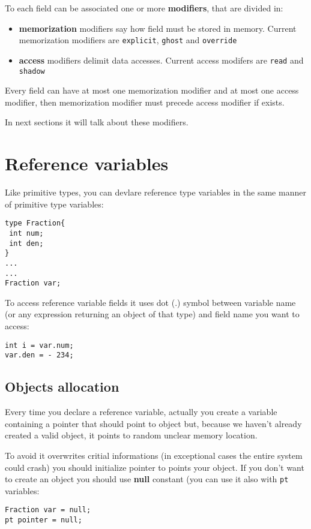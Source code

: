 \documentclass[10pt]{book}%
\newcommand{\code}[1]{\texttt{#1}}
\renewcommand{\emph}[1]{\textbf{#1}}
\newenvironment{codeenv}{
\begin{mdframed}[backgroundcolor=black!20,topline=false,leftline=false,rightline=false,bottomline=false]
}
{\end{mdframed}}
\begin{document}
To each field can be associated one or more \emph{modifiers}, that are divided in:
\begin{itemize}
\item \emph{memorization} modifiers say how field must be stored in memory. Current memorization modifiers are \code{explicit}, \code{ghost} and \code{override}
\item \emph{access} modifiers delimit data accesses. Current access modifers are \code{read} and \code{shadow}
\end{itemize}
Every field can have at most one memorization modifier and at most one access modifier, then memorization modifier must precede access modifier if exists.

In next sections it will talk about these modifiers.

\section{Reference variables}
Like primitive types, you can devlare reference type variables in the same manner of primitive type variables:
\begin{codeenv}
\begin{verbatim}
type Fraction{
 int num;
 int den;
}
...
...
Fraction var;
\end{verbatim}
\end{codeenv}
To access reference variable fields it uses dot (.) symbol between variable name (or any expression returning an object of that type) and field name you want to access:
\begin{codeenv}
\begin{verbatim}
int i = var.num;
var.den = - 234;
\end{verbatim}
\end{codeenv}

\subsection{Objects allocation}
Every time you declare a reference variable, actually you create a variable containing a pointer that should point to object but, because we haven't already created a valid object, it points to random unclear memory location.

To avoid it overwrites critial informations (in exceptional cases the entire system could crash) you should initialize pointer to points your object. If you don't want to create an object you should use \emph{null} constant (you can use it also with \code{pt} variables:
\begin{codeenv}
\begin{verbatim}
Fraction var = null;
pt pointer = null;
\end{verbatim}
\end{codeenv}
\end{document}
